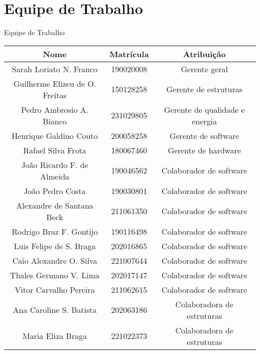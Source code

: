 \chapter{Equipe de Trabalho}

\begin{quadro}[htb]
  \caption{\label{quadro_equipe_trabalho}Equipe de Trabalho}

  \begin{tabular}{|c|c|c|}
    \hline
    \textbf{Nome} & \textbf{Matrícula} & \textbf{Atribuição} \\
    \hline
    Sarah Loriato N. Franco & 190020008 & Gerente geral \\
    \hline
    Guilherme Elizeu de O. Freitas & 150128258 & Gerente de estruturas \\
    \hline
    Pedro Ambrosio A. Bianco & 231029805 & Gerente de qualidade e energia \\
    \hline
    Henrique Galdino Couto & 200058258 & Gerente de software \\
    \hline
    Rafael Silva Frota & 180067460 & Gerente de hardware \\
    \hline
    João Ricardo F. de Almeida & 190046562 & Colaborador de software \\
    \hline
    João Pedro Costa & 190030801 & Colaborador de software \\
    \hline
    Alexandre de Santana Beck & 211061350 & Colaborador de software \\
    \hline
    Rodrigo Braz F. Gontijo & 190116498 & Colaborador de software \\
    \hline
    Luis Felipe de S. Braga & 202016865 & Colaborador de software \\
    \hline
    Caio Alexandre O. Silva & 221007644 & Colaborador de software \\
    \hline
    Thales Germano V. Lima & 202017147 & Colaborador de software \\
    \hline
    Vitor Carvalho Pereira & 211062615 & Colaborador de software \\
    \hline
    Ana Caroline S. Batista & 202063186 & Colaboradora de estruturas \\
    \hline
    Maria Eliza Braga & 221022373 & Colaboradora de estruturas \\
    \hline
  \end{tabular}

\end{quadro}
